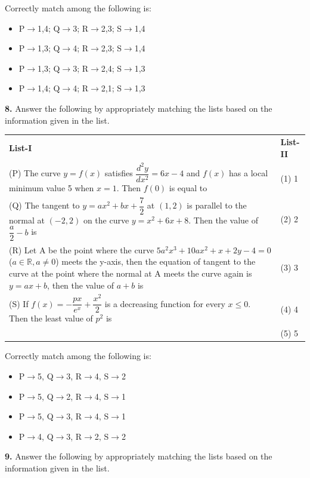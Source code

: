 \documentclass[10pt,twocolumn]{extarticle}
\renewcommand{\arraystretch}{1.15}
\newenvironment{qoptions}{\begin{itemize}[leftmargin=1.8em,itemsep=2pt,topsep=2pt,label={}]}{\end{itemize}}
\newcommand{\opt}[2]{\item[({#1})] {#2}}
\begin{document}
Correctly match among the following is:
\begin{qoptions}
\opt{A}{P$\to$1,4; Q$\to$3; R$\to$2,3; S$\to$1,4}
\opt{B}{P$\to$1,3; Q$\to$4; R$\to$2,3; S$\to$1,4}
\opt{C}{P$\to$1,3; Q$\to$3; R$\to$2,4; S$\to$1,3}
\opt{D}{P$\to$1,4; Q$\to$4; R$\to$2,1; S$\to$1,3}
\end{qoptions}

\textbf{8.} Answer the following by appropriately matching the lists based on the information given in the list.

\begin{center}
\renewcommand{\arraystretch}{1.25}
\begin{tabular}{@{}p{5.6cm}p{1.6cm}@{}}
\textbf{List-I} & \textbf{List-II} \\
(P) The curve $y=f(x)$ satisfies $\dfrac{d^2y}{dx^2}=6x-4$ and $f(x)$ has a local minimum value 5 when $x=1$. Then $f(0)$ is equal to & (1) 1 \\[6pt]
(Q) The tangent to $y=ax^2+bx+\dfrac{7}{2}$ at $(1,2)$ is parallel to the normal at $(-2,2)$ on the curve $y=x^2+6x+8$. Then the value of $\dfrac{a}{2}-b$ is & (2) 2 \\[6pt]
(R) Let A be the point where the curve $5a^2x^3+10ax^2+x+2y-4=0$ ($a\in\mathbb{R}, a\ne0$) meets the y-axis, then the equation of tangent to the curve at the point where the normal at A meets the curve again is $y=ax+b$, then the value of $a+b$ is & (3) 3 \\[6pt]
(S) If $f(x)=-\dfrac{px}{e^x}+\dfrac{x^2}{2}$ is a decreasing function for every $x\le0$. Then the least value of $p^2$ is & (4) 4 \\[2pt]
 & (5) 5 \\
\end{tabular}
\renewcommand{\arraystretch}{1.15}
\end{center}

Correctly match among the following is:
\begin{qoptions}
\opt{A}{P$\to$5, Q$\to$3, R$\to$4, S$\to$2}
\opt{B}{P$\to$5, Q$\to$2, R$\to$4, S$\to$1}
\opt{C}{P$\to$5, Q$\to$3, R$\to$4, S$\to$1}
\opt{D}{P$\to$4, Q$\to$3, R$\to$2, S$\to$2}
\end{qoptions}

\textbf{9.} Answer the following by appropriately matching the lists based on the information given in the list.
\end{document}
